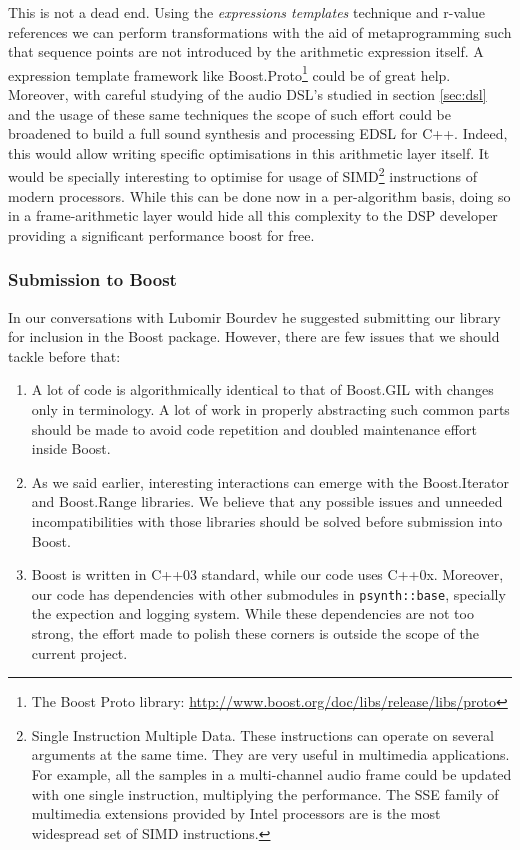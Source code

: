 This is not a dead end. Using the \emph{expressions templates}
\cite{veldhuizen95expression} technique and r-value references we can
perform transformations with the aid of metaprogramming such that
sequence points are not introduced by the arithmetic expression
itself. A expression template framework like Boost.Proto\footnote{The
  Boost Proto library:
  \url{http://www.boost.org/doc/libs/release/libs/proto}}
\cite{niebler07proto} could be of great help. Moreover, with careful
studying of the audio DSL's studied in section \ref{sec:dsl} and the
usage of these same techniques the scope of such effort could be
broadened to build a full sound synthesis and processing EDSL for
C++. Indeed, this would allow writing specific optimisations in this
arithmetic layer itself. It would be specially interesting to optimise
for usage of SIMD\footnote{Single Instruction Multiple Data. These
  instructions can operate on several arguments at the same time. They
  are very useful in multimedia applications. For example, all the
  samples in a multi-channel audio frame could be updated with one
  single instruction, multiplying the performance. The SSE family of
  multimedia extensions provided by Intel processors are is the most
  widespread set of SIMD instructions.} instructions of modern
processors. While this can be done now in a per-algorithm basis, doing
so in a frame-arithmetic layer would hide all this complexity to the
DSP developer providing a significant performance boost for free.

\subsubsection{Submission to Boost}

In our conversations with Lubomir Bourdev he suggested submitting our
library for inclusion in the Boost package. However, there are few
issues that we should tackle before that:

\begin{enumerate}
\item A lot of code is algorithmically identical to that of Boost.GIL
  with changes only in terminology. A lot of work in properly
  abstracting such common parts should be made to avoid code
  repetition and doubled maintenance effort inside Boost.

\item As we said earlier, interesting interactions can emerge with
  the Boost.Iterator and Boost.Range libraries. We believe that any
  possible issues and unneeded incompatibilities with those libraries
  should be solved before submission into Boost.

\item Boost is written in C++03 standard, while our code uses
  C++0x. Moreover, our code has dependencies with other submodules in
  \texttt{psynth::base}, specially the expection and logging
  system. While these dependencies are not too strong, the effort made
  to polish these corners is outside the scope of the current project.
\end{enumerate}

